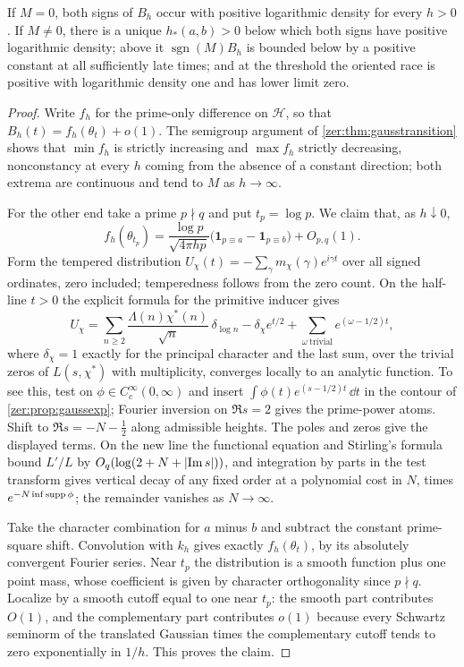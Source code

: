 \begin{theorem}\label{zer:thm:gausspairs}
If $M=0$, both signs of $B_h$ occur with positive logarithmic density for every $h>0$. If $M\ne0$,
there is a unique $h_*(a,b)>0$ below which both signs have positive logarithmic density; above it
$\operatorname{sgn}(M)B_h$ is bounded below by a positive constant at all sufficiently late times;
and at the threshold the oriented race is positive with logarithmic density one and has lower
limit zero.
\end{theorem}
\begin{proof}
Write $f_h$ for the prime-only difference on $\mathcal H$, so that $B_h(t)=f_h(\theta_t)+o(1)$. The
semigroup argument of \cref{zer:thm:gausstransition} shows that $\min f_h$ is strictly increasing
and $\max f_h$ strictly decreasing, nonconstancy at every $h$ coming from the absence of a constant
direction; both extrema are continuous and tend to $M$ as $h\to\infty$.

For the other end take a prime $p\nmid q$ and put $t_p=\log p$. We claim that, as $h\downarrow0$,
\[
 f_h(\theta_{t_p})=\frac{\log p}{\sqrt{4\pi hp}}\bigl(\mathbf 1_{p\equiv a}-\mathbf 1_{p\equiv b}\bigr)+O_{p,q}(1).
\]
Form the tempered distribution $U_\chi(t)=-\sum_\gamma m_\chi(\gamma)e^{i\gamma t}$ over all signed
ordinates, zero included; temperedness follows from the zero count. On the half-line $t>0$ the
explicit formula for the primitive inducer gives
\[
 U_\chi=\sum_{n\ge2}\frac{\Lambda(n)\chi^*(n)}{\sqrt n}\,\delta_{\log n}-\delta_\chi e^{t/2}
 +\sum_{\omega\ \mathrm{trivial}}e^{(\omega-1/2)t},
\]
where $\delta_\chi=1$ exactly for the principal character and the last sum, over the trivial zeros of
$L(s,\chi^*)$ with multiplicity, converges locally to an analytic function. To see this, test on
$\phi\in C_c^\infty(0,\infty)$ and insert $\int\phi(t)e^{(s-1/2)t}\,\dd t$ in the contour of
\cref{zer:prop:gaussexp}; Fourier inversion on $\Re s=2$ gives the prime-power atoms. Shift to
$\Re s=-N-\tfrac12$ along admissible heights. The poles and zeros give the displayed terms. On the
new line the functional equation and Stirling's formula bound $L'/L$ by $O_q(\log(2+N+\lvert\operatorname{Im} s\rvert))$,
and integration by parts in the test transform gives vertical decay of any fixed order at a
polynomial cost in $N$, times $e^{-N\inf\operatorname{supp}\phi}$; the remainder vanishes as $N\to\infty$.

Take the character combination for $a$ minus $b$ and subtract the constant prime-square shift.
Convolution with $k_h$ gives exactly $f_h(\theta_t)$, by its absolutely convergent Fourier series.
Near $t_p$ the distribution is a smooth function plus one point mass, whose coefficient is given by
character orthogonality since $p\nmid q$. Localize by a smooth cutoff equal to one near $t_p$: the
smooth part contributes $O(1)$, and the complementary part contributes $o(1)$ because every
Schwartz seminorm of the translated Gaussian times the complementary cutoff tends to zero
exponentially in $1/h$. This proves the claim.


\end{proof}
